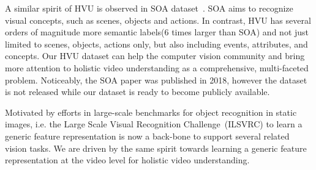 \documentclass[runningheads]{llncs}
\begin{document}
\begin{table*}[t] 
\centering
\small
\tabcolsep=0.2cm
\caption{Comparison of the HVU dataset with other publicly available video recognition datasets in terms of \#labels per category. Note that SOA is not publicly available.}
\label{table:Action_Datasets}
\vspace{-1cm}
\end{table*}


A similar spirit of HVU is observed in SOA dataset~\cite{soadata}. SOA aims to recognize visual concepts, such as scenes, objects and actions. In contrast, HVU has several orders of magnitude more semantic labels(6 times larger than SOA) and not just limited to scenes, objects, actions only, but also including events, attributes, and concepts. Our HVU dataset can help the computer vision community and bring more attention to holistic video understanding  as a comprehensive, multi-faceted problem. Noticeably, the SOA paper was published in 2018, however the dataset is not released while our dataset is ready to become publicly available.



Motivated by efforts in large-scale benchmarks for object recognition in static images, i.e. the Large Scale Visual Recognition Challenge~(ILSVRC) to learn a generic feature representation is now a back-bone to support several related vision tasks. We are driven by the same spirit towards learning a generic feature representation at the video level for holistic video understanding.
\vspace{-0.2cm} 
\end{document}

